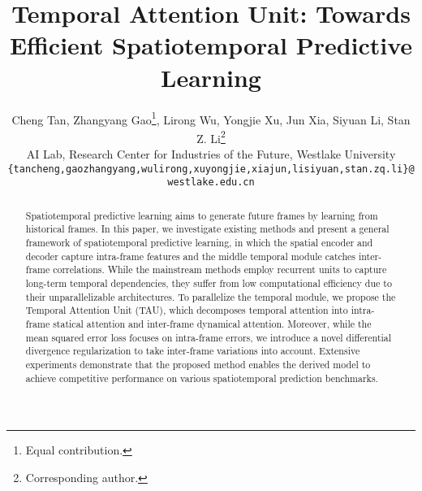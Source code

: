 \documentclass[10pt,twocolumn,letterpaper]{article}
\begin{document}
\title{Temporal Attention Unit: Towards Efficient Spatiotemporal Predictive Learning}

\author{Cheng Tan, Zhangyang Gao\footnotemark[1]\thanks{Equal contribution.}, Lirong Wu, Yongjie Xu, Jun Xia, Siyuan Li, Stan Z. Li\thanks{Corresponding author.} \\ AI Lab, Research Center for Industries of the Future, Westlake University \\
{\tt\small \{tancheng,gaozhangyang,wulirong,xuyongjie,xiajun,lisiyuan,stan.zq.li\}@westlake.edu.cn}
}
\maketitle
\begin{abstract}
Spatiotemporal predictive learning aims to generate future frames by learning from historical frames. In this paper, we investigate existing methods and present a general framework of spatiotemporal predictive learning, in which the spatial encoder and decoder capture intra-frame features and the middle temporal module catches inter-frame correlations. While the mainstream methods employ recurrent units to capture long-term temporal dependencies, they suffer from low computational efficiency due to their unparallelizable architectures. To parallelize the temporal module, we propose the Temporal Attention Unit (TAU), which decomposes temporal attention into intra-frame statical attention and inter-frame dynamical attention. Moreover, while the mean squared error loss focuses on intra-frame errors, we introduce a novel differential divergence regularization to take inter-frame variations into account. Extensive experiments demonstrate that the proposed method enables the derived model to achieve competitive performance on various spatiotemporal prediction benchmarks.
\end{abstract}
\end{document}
